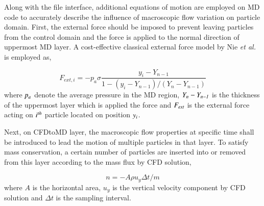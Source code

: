 \documentclass[preprint,12pt]{elsarticle}
\newcommand{\skonote}[1]{ {\textcolor{green} { ***Jeff: #1 }}}
\newcommand{\skonote}[1]{}
\begin{document}
Along with the file interface, additional equations of motion are employed on MD code to accurately describe the influence of macroscopic flow variation on particle domain. First, the external force should be imposed to prevent leaving particles from the control domain and the force is applied to the normal direction of uppermost MD layer. A cost-effective classical external force model by Nie {\it{et al.}}~\cite{Nie} is employed as,


\vspace{-.2em}
\begin{equation}
 F_{ext, i} = -p_{a}\sigma\frac{y_{i}-Y_{n-1}}{1-(y_{i}-Y_{n-1})/(Y_{n}-Y_{n-1})}
 \label{eq:External_Force}
\end{equation}
\normalsize
where $\it p_{a}$ denote the average pressure in the MD region, $\it Y_{n}-Y_{n-1}$ is the thickness of the uppermost layer which is applied the force and $\it F_{ext}$ is the external force acting on $\it i^{th}$ particle located on position $\it y_{i}$.


Next, on CFDtoMD layer, the macroscopic flow properties at specific time shall be introduced to lead the motion of multiple particles in that layer. To satisfy mass conservation, a certain number of particles are inserted into or removed from this layer according to the mass flux by CFD solution,

\vspace{-.2em}
\begin{equation}
n = -A \rho u_y \Delta t / m
 \label{eq:Mass_Flux}
\end{equation}
\normalsize
where $A$ is the horizontal area, $u_y$ is the vertical velocity component by CFD solution and $\Delta t$ is the sampling interval.
\end{document}
